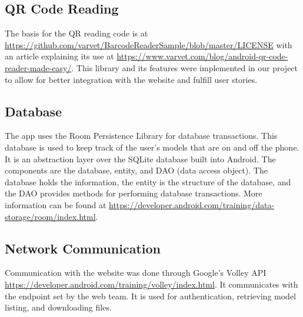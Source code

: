 \subsection{QR Code Reading}
    The basis for the QR reading code is at \url{https://github.com/varvet/BarcodeReaderSample/blob/master/LICENSE} with an article explaining its use at \url{https://www.varvet.com/blog/android-qr-code-reader-made-easy/}. This library and its features were implemented in our project to allow for better integration with the website and fulfill user stories.

\subsection{Database}
    The app uses the Room Persistence Library for database transactions. This database is used to keep track of the user's models that are on and off the phone. It is an abstraction layer over the SQLite database built into Android. The components are the database, entity, and DAO (data access object). The database holds the information, the entity is the structure of the database, and the DAO provides methods for performing database transactions. More information can be found at \url{https://developer.android.com/training/data-storage/room/index.html}.

\subsection{Network Communication}
    Communication with the website was done through Google's Volley API \url{https://developer.android.com/training/volley/index.html}. It communicates with the endpoint set by the web team. It is used for authentication, retrieving model listing, and downloading files.